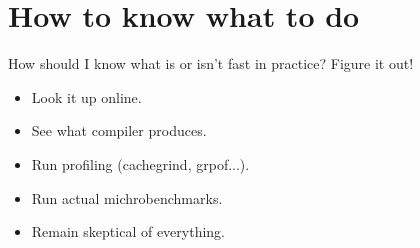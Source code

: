 \documentclass[11pt, aspectratio=169, table]{beamer}
\begin{document}
\section{How to know what to do}
\begin{frame}{How should I know what is or isn't fast in practice?}
\setlength{\parskip}{\fill}
\pause
\alert{Figure it out!}
\begin{itemize}
\item Look it up online.
\item See what compiler produces.
\item Run profiling (cachegrind, grpof...).
\item Run actual michrobenchmarks.
\item Remain skeptical of everything. 
\end{itemize}
\end{frame}

%
\end{document}

